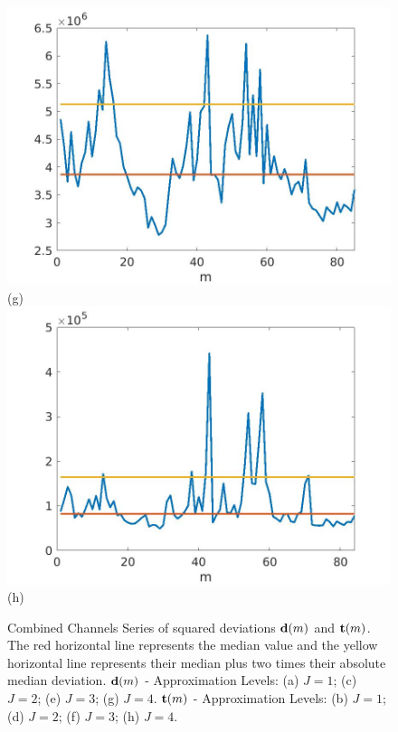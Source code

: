 \documentclass[journal]{IEEEtran}
\newcommand{\vd}{{\textbf d}}
\newcommand{\vt}{{\textbf t}}
\begin{document}
\begin{figure}[htp!]
\includegraphics[scale=.12]{../../figs/J4_euclid_squared_meandev}(g)
\includegraphics[scale=.12]{../../figs/consecdif_J4_euclid_squared_meandev}(h)
\caption{{\sc Combined Channels} Series of squared deviations $\vd(m)$ and $\vt(m)$. The red horizontal line represents the median value  and the yellow horizontal line represents their median plus two times their absolute median deviation.  $\vd(m)$ - Approximation Levels:  (a) $J=1$; (c) $J=2$; (e) $J=3$; (g) $J=4$. $\vt(m)$ - Approximation Levels:  (b) $J=1$; (d) $J=2$; (f) $J=3$; (h) $J=4$. 
}
\label{F:squared_J1-4_euclid}
\end{figure}
\end{document}
